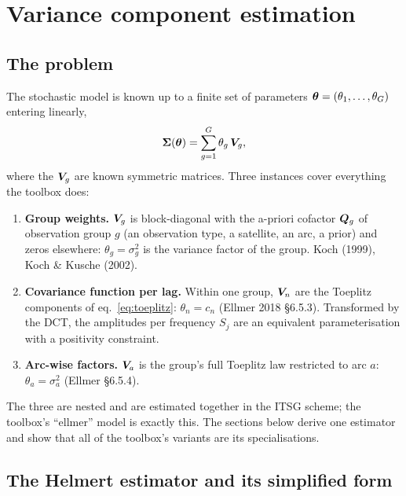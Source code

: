 \chapter{Variance component estimation}
\label{ch:vce}

\section{The problem}

The stochastic model is known up to a finite set of parameters $\bm{\theta} = (\theta_1,\dots,\theta_G)$ entering linearly,
\begin{equation}
\bm{\Sigma}(\bm{\theta}) = \sum_{g=1}^G \theta_g\,\bm{V}_g ,
\label{eq:vcmodel}
\end{equation}
where the $\bm{V}_g$ are known symmetric matrices. Three instances cover everything the toolbox does:
\begin{enumerate}[label=(\alph*)]
\item \textbf{Group weights.} $\bm{V}_g$ is block-diagonal with the a-priori cofactor $\bm{Q}_g$ of observation group $g$ (an observation type, a satellite, an arc, a prior) and zeros elsewhere: $\theta_g = \sigma_g^2$ is the variance factor of the group. Koch (1999), Koch \& Kusche (2002).
\item \textbf{Covariance function per lag.} Within one group, $\bm{V}_n$ are the Toeplitz components of eq.~\eqref{eq:toeplitz}: $\theta_n = c_n$ (Ellmer 2018 §6.5.3). Transformed by the DCT, the amplitudes per frequency $S_j$ are an equivalent parameterisation with a positivity constraint.
\item \textbf{Arc-wise factors.} $\bm{V}_a$ is the group's full Toeplitz law restricted to arc $a$: $\theta_a = \sigma_a^2$ (Ellmer §6.5.4).
\end{enumerate}
The three are nested and are estimated together in the ITSG scheme; the toolbox's ``ellmer'' model is exactly this. The sections below derive one estimator and show that all of the toolbox's variants are its specialisations.

\section{The Helmert estimator and its simplified form}
\label{sec:helmert}

